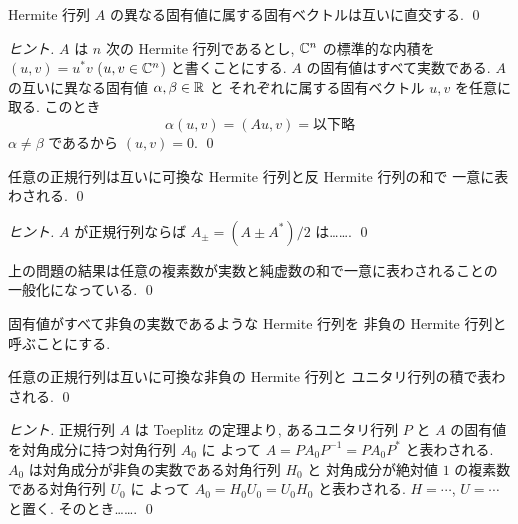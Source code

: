 \documentclass[12pt,twoside]{jarticle}
\begin{document}

\begin{question}[5点]
\label{q:normal-3}
  Hermite 行列 $A$ の異なる固有値に属する固有ベクトルは互いに直交する.  \qed
\end{question}

\begin{proof}[ヒント]
  $A$ は $n$ 次の Hermite 行列であるとし, 
  ${\mathbb C}^n$ の標準的な内積を $(u,v)=u^*v$ ($u,v\in{\mathbb C}^n$) と書くことにする.
  $A$ の固有値はすべて実数である.
  $A$ の互いに異なる固有値 $\alpha,\beta\in{\mathbb R}$ と
  それぞれに属する固有ベクトル $u,v$ を任意に取る.
  このとき
  \begin{equation*}
    \alpha(u,v)=(Au,v)=\text{以下略}
  \end{equation*}
  $\alpha\ne\beta$ であるから $(u,v)=0$. \qed
\end{proof}


\begin{question}[5点]
\label{q:normal-4}
  任意の正規行列は互いに可換な Hermite 行列と反 Hermite 行列の和で
  一意に表わされる.
  \qed
\end{question}

\begin{proof}[ヒント]
  $A$ が正規行列ならば $A_{\pm}=(A\pm A^*)/2$ は…….
  \qed
\end{proof}

\begin{guide}
  上の問題の結果は任意の複素数が実数と純虚数の和で一意に表わされることの
  一般化になっている. \qed
\end{guide}


固有値がすべて非負の実数であるような Hermite 行列を
非負の Hermite 行列と呼ぶことにする.

\begin{question}[5点]
\label{q:normal-5}
  任意の正規行列は互いに可換な非負の Hermite 行列と
  ユニタリ行列の積で表わされる.
  \qed
\end{question}

\begin{proof}[ヒント]
  正規行列 $A$ は Toeplitz の定理より, あるユニタリ行列 $P$ 
  と $A$ の固有値を対角成分に持つ対角行列 $A_0$ に
  よって $A=PA_0P^{-1}=PA_0P^*$ と表わされる.
  $A_0$ は対角成分が非負の実数である対角行列 $H_0$ と
  対角成分が絶対値 $1$ の複素数である対角行列 $U_0$ に
  よって $A_0=H_0U_0=U_0H_0$ と表わされる.
  $H=\cdots$, $U=\cdots$ と置く. そのとき…….
  \qed
\end{proof}
\end{document}
